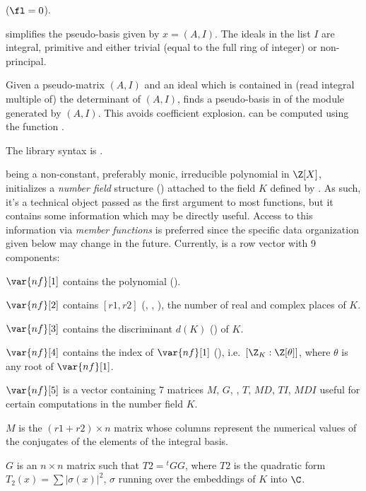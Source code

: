  ($\fl = 0$).

 simplifies the pseudo-basis
given by $x = (A,I)$. The ideals in the list $I$ are integral, primitive and
either trivial (equal to the full ring of integer) or non-principal.

\label{se:nfhnfmod}
Given a pseudo-matrix $(A,I)$
and an ideal  which is contained in (read integral multiple of) the
determinant of $(A,I)$, finds a pseudo-basis in 
of the module generated by $(A,I)$. This avoids coefficient explosion.
 can be computed using the function .

The library syntax is .

\label{se:nfinit}
 being a non-constant,
preferably monic, irreducible polynomial in $\Z[X]$, initializes a
\emph{number field} structure () attached to the field $K$ defined
by . As such, it's a technical object passed as the first argument
to most  functions, but it contains some information which
may be directly useful. Access to this information via \emph{member
functions} is preferred since the specific data organization given below
may change in the future. Currently,  is a row vector with 9
components:

$\var{nf}[1]$ contains the polynomial  ().

$\var{nf}[2]$ contains $[r1,r2]$ (, ,
), the number of real and complex places of $K$.

$\var{nf}[3]$ contains the discriminant $d(K)$ () of $K$.

$\var{nf}[4]$ contains the index of $\var{nf}[1]$ (),
i.e.~$[\Z_K : \Z[\theta]]$, where $\theta$ is any root of $\var{nf}[1]$.

$\var{nf}[5]$ is a vector containing 7 matrices $M$, $G$, , $T$,
$MD$, $TI$, $MDI$ useful for certain computations in the number field $K$.

\quad\item $M$ is the $(r1+r2)\times n$ matrix whose columns represent
the numerical values of the conjugates of the elements of the integral
basis.

\quad\item $G$ is an $n\times n$ matrix such that $T2 = {}^t G G$,
where $T2$ is the quadratic form $T_2(x) = \sum |\sigma(x)|^2$, $\sigma$
running over the embeddings of $K$ into $\C$.

